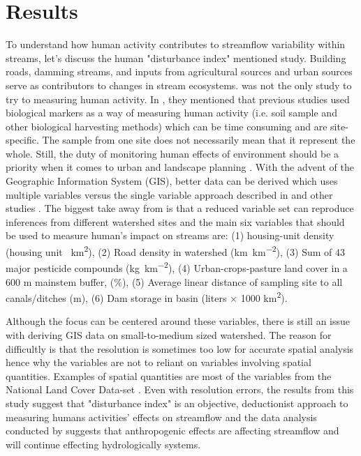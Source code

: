 \documentclass[a4paper,man,biblatex]{apa7}
\begin{document}
\section{Results}
\par To understand how human activity contributes to streamflow variability within streams, let's discuss the human "disturbance index" mentioned \textcite{falcone_2016} study. Building roads, damming streams, and inputs from agricultural sources and urban sources serve as contributors to changes in stream ecosystems. \textcite{falcone_2016} was not the only study to try to measuring human activity. In \textcite{stein_2002}, they mentioned that previous studies used biological markers as a way of measuring human activity (i.e. soil sample and other biological harvesting methods) which can be time consuming and are site-specific. The sample from one site does not necessarily mean that it represent the whole. Still, the duty of monitoring human effects of environment should be a priority when it comes to urban and landscape planning \autocite{stein_2002}. With the advent of the Geographic Information System (GIS), better data can be derived which uses multiple variables versus the single variable approach described in \textcite{stein_2002} and other studies \autocite{falcone_2016}. The biggest take away from \textcite{falcone_2016} is that a reduced variable set can reproduce inferences from different watershed sites and the main six variables that should be used to measure human's impact on streams are: (1) housing-unit density (housing unit \si{\per\square\kilo\meter}), (2) Road density in watershed (\si{\kilo\meter\per\square\kilo\meter}), (3) Sum of 43 major pesticide compounds (\si{\kilo\gram\per\square\kilo\meter}), (4) Urban-crops-pasture land cover in a 600 m mainstem buffer, (\%), (5) Average linear distance of sampling site to all canals/ditches (m), (6) Dam storage in basin (liters $\times$ 1000 \si{\square\kilo\meter}). 
\par Although the focus can be centered around these variables, there is still an issue with deriving GIS data on small-to-medium sized watershed. The reason for difficultly is that the resolution is sometimes too low for accurate spatial analysis hence why the variables are not to reliant on variables involving spatial quantities. Examples of spatial quantities are most of the variables from the National Land Cover Data-set \autocite{falcone_2016}. Even with resolution errors, the results from this study suggest that "disturbance index" is an objective, deductionist approach to measuring humans activities' effects on streamflow and the data analysis conducted by \textcite{mallakpour_2018} suggests that anthropogenic effects are affecting streamflow  and will continue effecting hydrologically systems.\\
\end{document}
